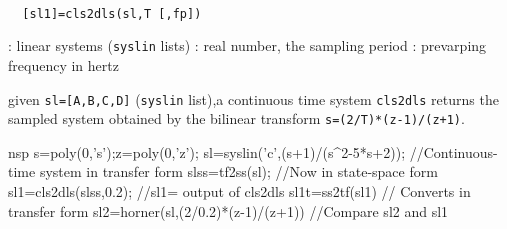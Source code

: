\begin{mandesc}
   \\ %
\end{mandesc}
\begin{calling_sequence}
\begin{verbatim}
  [sl1]=cls2dls(sl,T [,fp])  
\end{verbatim}
\end{calling_sequence}
\begin{parameters}
  \begin{varlist}
    : linear systems (\verb!syslin! lists)
    : real number, the sampling period
    : prevarping frequency in hertz
  \end{varlist}
\end{parameters}
\begin{mandescription}
  given \verb!sl=[A,B,C,D]! (\verb!syslin! list),a continuous time system 
  \verb!cls2dls! returns the sampled system obtained by the 
  bilinear transform \verb!s=(2/T)*(z-1)/(z+1)!.
\end{mandescription}
\begin{examples}
  \begin{mintednsp}{nsp}
    s=poly(0,'s');z=poly(0,'z');
    sl=syslin('c',(s+1)/(s^2-5*s+2));  //Continuous-time system in transfer form
    slss=tf2ss(sl);  //Now in state-space form
    sl1=cls2dls(slss,0.2);  //sl1= output of cls2dls
    sl1t=ss2tf(sl1) // Converts in transfer form
    sl2=horner(sl,(2/0.2)*(z-1)/(z+1))   //Compare sl2 and sl1
  \end{mintednsp}
\end{examples}
\begin{manseealso}
\end{manseealso}

